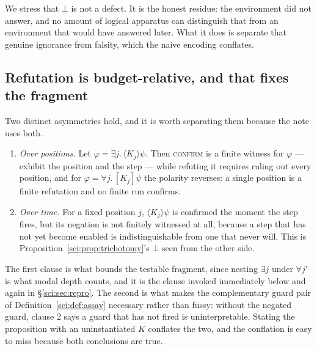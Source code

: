 We stress that $\bot$ is not a defect. It is the honest residue: the environment did not answer, and
no amount of logical apparatus can distinguish that from an environment that would have answered
later. What it does is separate that genuine ignorance from falsity, which the naive encoding conflates.

\subsection{Refutation is budget-relative, and that fixes the fragment}\label{sci:S4.3}

\begin{proposition}
\label{sci:prop:asymmetry}
Two distinct asymmetries hold, and it is worth separating them because the note uses both.
\begin{enumerate}
\item \emph{Over positions.} Let $\varphi = \exists j.\,\langle K_j \rangle \psi$. Then
\textsc{confirm} is a finite witness for $\varphi$ --- exhibit the position and the step --- while
refuting it requires ruling out every position, and for $\varphi = \forall j.\,[K_j]\psi$ the
polarity reverses: a single position is a finite refutation and no finite run confirms.
\item \emph{Over time.} For a fixed position $j$, $\langle K_j\rangle\psi$ is confirmed the moment
the step fires, but its negation is not finitely witnessed at all, because a step that has not yet
become enabled is indistinguishable from one that never will. This is Proposition~\ref{sci:prop:trichotomy}'s
$\bot$ seen from the other side.
\end{enumerate}
\end{proposition}

\begin{remark}
\label{sci:rem:whichasym}
The first clause is what bounds the testable fragment, since nesting $\exists j$ under $\forall j'$
is what modal depth counts, and it is the clause invoked immediately below and again in
\S\ref{sci:sec:repro}. The second is what makes the complementary guard pair of
Definition~\ref{sci:def:assay} necessary rather than fussy: without the negated guard, clause 2 says a
guard that has not fired is uninterpretable. Stating the proposition with an uninstantiated $K$
conflates the two, and the conflation is easy to miss because both conclusions are true.
\end{remark}

